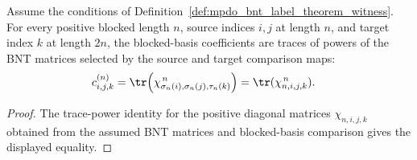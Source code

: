 \begin{corollary}%
    \label{cor:mpdo_bnt_label_theorem_witness_blocked_coeff_eq_positive_blocked_chi_trace_pow}
    \leanok
    Assume the conditions of
    Definition~\ref{def:mpdo_bnt_label_theorem_witness}.
    For every positive blocked length $n$, source indices $i,j$ at
    length $n$, and target index $k$ at length $2n$, the blocked-basis
    coefficients are traces of powers of the BNT matrices selected by
    the source and target comparison maps:
    \begin{align}
        c^{(n)}_{i,j,k}
         & = \tr\!\left(\chi_{\sigma_n(i),\sigma_n(j),\tau_n(k)}^{\,n}\right)
        = \tr(\chi_{n,i,j,k}^{\,n}).
        \notag
    \end{align}
\end{corollary}
\begin{proof}\leanok
    The trace-power identity for the positive diagonal matrices
    $\chi_{n,i,j,k}$ obtained from the assumed BNT matrices and
    blocked-basis comparison gives the displayed equality.
\end{proof}
